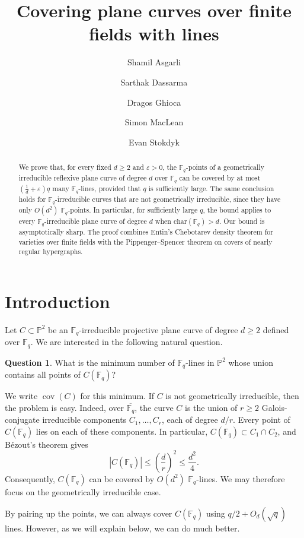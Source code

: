 \documentclass[12pt,reqno]{amsart}
\title{Covering plane curves over finite fields with lines}
\author{Shamil Asgarli}
\author{Sarthak Dassarma}
\author{Dragos Ghioca}
\author{Simon MacLean}
\author{Evan Stokdyk}
\theoremstyle{definition}
\newtheorem{question}[theorem]{Question}
\theoremstyle{remark}
\newcommand{\Fq}{\mathbb{F}_q}
\newcommand{\bP}{\mathbb{P}}
\begin{document}
\begin{abstract}
We prove that, for every fixed $d\geq 2$ and $\varepsilon>0$, the $\mathbb{F}_q$-points of a geometrically irreducible reflexive plane curve of degree $d$ over $\mathbb{F}_q$ can be covered by at most $\left(\frac{1}{d}+\varepsilon\right)q$ many $\mathbb{F}_q$-lines, provided that $q$ is sufficiently large. The same conclusion holds for $\mathbb{F}_q$-irreducible curves that are not geometrically irreducible, since they have only $O(d^2)$ $\mathbb{F}_q$-points. In particular, for sufficiently large $q$, the bound applies to every $\mathbb{F}_q$-irreducible plane curve of degree $d$ when $\mathrm{char}(\mathbb{F}_q)>d$. Our bound is asymptotically sharp. The proof combines Entin's Chebotarev density theorem for varieties over finite fields with the Pippenger--Spencer theorem on covers of nearly regular hypergraphs.
\end{abstract}

\maketitle

\section{Introduction}

Let $C \subset \bP^2$ be an $\Fq$-irreducible projective plane curve of degree $d\geq 2$ defined over $\Fq$. We are interested in the following natural question.

\begin{question}
What is the minimum number of $\Fq$-lines in $\bP^2$ whose union contains all points of $C(\Fq)$?
\end{question}

We write $\operatorname{cov}(C)$ for this minimum. If $C$ is not geometrically irreducible, then the problem is easy. Indeed, over $\overline{\Fq}$, the curve $C$ is the union of $r\geq 2$ Galois-conjugate irreducible components $C_1,\ldots,C_r$, each of degree $d/r$. Every point of $C(\Fq)$ lies on each of these components. In particular, $C(\Fq)\subset C_1\cap C_2$, and B\'ezout's theorem gives
\[
|C(\Fq)|\leq \left(\frac{d}{r}\right)^2\leq \frac{d^2}{4}.
\]
Consequently, $C(\Fq)$ can be covered by $O(d^2)$ $\Fq$-lines. We may therefore focus on the geometrically irreducible case.

By pairing up the points, we can always cover $C(\Fq)$ using $q/2+O_d(\sqrt{q})$ lines. However, as we will explain below, we can do much better.
\end{document}
